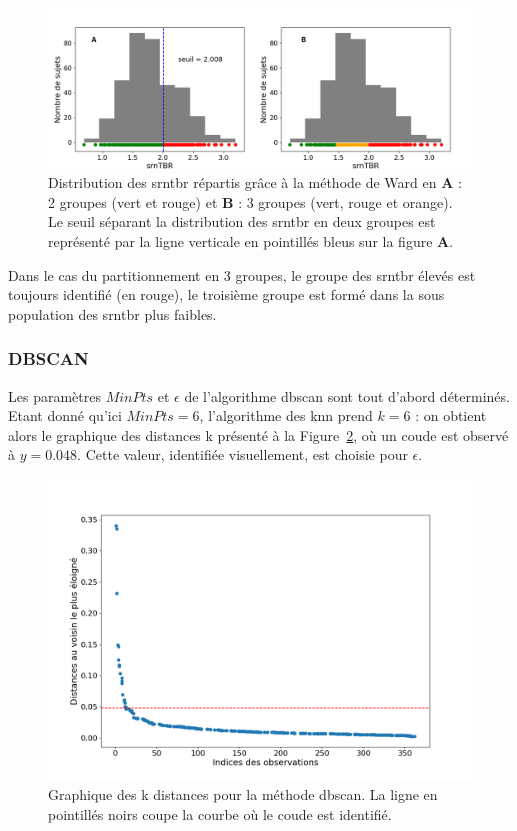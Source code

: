 \begin{figure}[h!]
  \centering
	\includegraphics[width=1.0\linewidth]{figures/chapter-4/tbr-histogram-ward} 
  \caption[Résultats du partitionnement en deux et trois groupes selon la méthode de Ward.]{Distribution des \gls{srntbr} répartis grâce à la méthode de Ward en \textbf{A} : 2 groupes (vert et rouge) et \textbf{B} : 3 groupes 
	(vert, rouge et orange). Le seuil séparant la distribution des \gls{srntbr} en deux groupes est représenté par la ligne verticale en pointillés bleus sur la 
	figure \textbf{A}.}
  \label{Figure:tbr_ward_histograms}
\end{figure}

Dans le cas du partitionnement en 3 groupes, le groupe des \gls{srntbr} élevés est toujours identifié (en rouge), le troisième groupe est formé dans 
la sous population des \gls{srntbr} plus faibles. 

\subsubsection{DBSCAN}

Les paramètres $MinPts$ et $\epsilon$ de l'algorithme \gls{dbscan} sont tout d'abord déterminés. Etant donné qu'ici $MinPts = 6$, 
l'algorithme des \gls{knn} prend $k = 6$ : on obtient alors le graphique des distances k présenté à la Figure~\ref{Figure:tbr_dbscan_kdistance_plot}, 
où un coude est observé à $y = 0.048$. Cette valeur, identifiée visuellement, est choisie pour $\epsilon$.

\begin{figure}[h!]
  \centering
	\includegraphics[width=0.7\linewidth]{figures/chapter-4/tbr-dbscan-knn-plot} 
  \caption[Graphique des k distances pour la méthode \gls{dbscan}.]{Graphique des k distances pour la méthode \gls{dbscan}. La ligne en pointillés noirs coupe la courbe où le coude est identifié.}
  \label{Figure:tbr_dbscan_kdistance_plot}
\end{figure}

